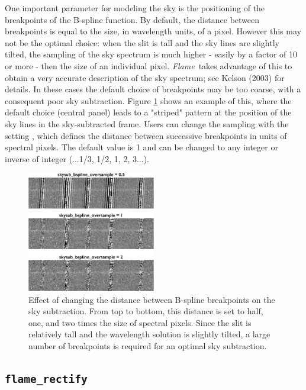 \documentclass[a4paper]{article}
\newcommand{\flame}{\emph{Flame}}
\begin{document}
\begin{sloppypar}
One important parameter for modeling the sky is the positioning of the breakpoints of the B-spline function. By default, the distance between breakpoints is equal to the size, in wavelength units, of a pixel. However this may not be the optimal choice: when the slit is tall and the sky lines are slightly tilted, the sampling of the sky spectrum is much higher - easily by a factor of 10 or more - then the size of an individual pixel. \flame\ takes advantage of this to obtain a very accurate description of the sky spectrum; see Kelson (2003) for details. In these cases the default choice of breakpoints may be too coarse, with a consequent poor sky subtraction. Figure \ref{fig:bspline} shows an example of this, where the default choice (central panel) leads to a "striped" pattern at the position of the sky lines in the sky-subtracted frame. Users can change the sampling with the setting , which defines the distance between successive breakpoints in units of spectral pixels. The default value is 1 and can be changed to any integer or inverse of integer (...1/3, 1/2, 1, 2, 3...).


\begin{figure}[tbp]
\centering
\includegraphics[width=0.5\textwidth]{oversample}
\caption{Effect of changing the distance between B-spline breakpoints on the sky subtraction. From top to bottom, this distance is set to half, one, and two times the size of spectral pixels. Since the slit is relatively tall and the wavelength solution is slightly tilted, a large number of breakpoints is required for an optimal sky subtraction.}
\label{fig:bspline}
\end{figure}


\subsection{\texttt{flame\_rectify}}
\label{sec:rectify}


\end{sloppypar}
\end{document}
